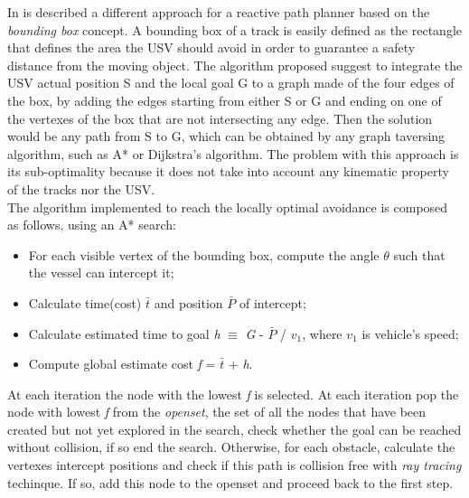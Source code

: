 \documentclass[journal]{IEEEtran}
\begin{document}
              \indent In \cite{Casalino2009} is described a different approach for a reactive path planner based on the \textit{bounding box} concept. A bounding box of a track is easily defined as the rectangle that defines the area the USV should avoid in order to guarantee a safety distance from the moving object. The algorithm proposed suggest to integrate the USV actual position S and the local goal G to a graph made of the four edges of the box, by adding the edges starting from either S or G and ending on one of the vertexes of the box that are not intersecting any edge. Then the solution would be any path from S to G, which can be obtained by any graph taversing algorithm, such as A* or Dijkstra's algorithm. The problem with this approach is its sub-optimality because it does not take into account any kinematic property of the tracks nor the USV.\\
              The algorithm implemented to reach the locally optimal avoidance is composed as follows, using an A* search:
                    \begin{itemize}
                          \item For each visible vertex of the bounding box, compute the angle $\theta$ such that the vessel can intercept it;
                          \item Calculate time(cost) \textit{$\bar{t}$} and position $\bar{P}$ of intercept;
                          \item Calculate estimated time to goal \textit{h} $\equiv$ \textit{G} - \textit{$\bar{P}$} / \textit{$v_1$}, where \textit{$v_1$} is vehicle's speed;
                          \item Compute global estimate cost \textit{f} = \textit{$\bar{t}$} + \textit{h}.
                    \end{itemize}
              At each iteration the node with the lowest \textit{f} is selected. At each iteration pop the node with lowest \textit{f} from the \textit{openset}, the set of all the nodes that have been created but not yet explored in the search, check whether the goal can be reached without collision, if so end the search. Otherwise, for each obstacle, calculate the vertexes intercept positions and check if this path is collision free with \textit{ray tracing} techinque. If so, add this node to the openset and proceed back to the first step.\\
\end{document}

